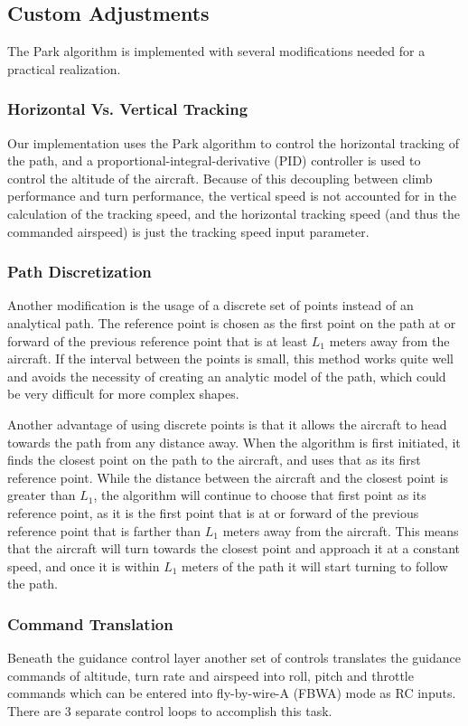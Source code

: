 \documentclass{aiaa}
\begin{document}
\subsection{Custom Adjustments}
The Park algorithm is implemented with several modifications needed for a practical realization.

\subsubsection{Horizontal Vs. Vertical Tracking}
 Our implementation uses the Park algorithm to control the horizontal tracking of the path, and a proportional-integral-derivative (PID) controller is used to control the altitude of the aircraft. Because of this decoupling between climb performance and turn performance, the vertical speed is not accounted for in the calculation of the tracking speed, and the horizontal tracking speed (and thus the commanded airspeed) is just the tracking speed input parameter.

\subsubsection{Path Discretization}
Another modification is the usage of a discrete set of points instead of an analytical path. The reference point is chosen as the first point on the path at or forward of the previous reference point that is at least $L_1$ meters away from the aircraft. If the interval between the points is small, this method works quite well and avoids the necessity of creating an analytic model of the path, which could be very difficult for more complex shapes. 

Another advantage of using discrete points is that it allows the aircraft to head towards the path from any distance away. When the algorithm is first initiated, it finds the closest point on the path to the aircraft, and uses that as its first reference point. While the distance between the aircraft and the closest point is greater than $L_1$, the algorithm will continue to choose that first point as its reference point, as it is the first point that is at or forward of the previous reference point that is farther than $L_1$ meters away from the aircraft. 
This means that the aircraft will turn towards the closest point and approach it at a constant speed, and once it is within $L_1$ meters of the path it will start turning to follow the path. 

\subsubsection{Command Translation}
Beneath the guidance control layer another set of controls translates the guidance commands of altitude, turn rate and airspeed into roll, pitch and throttle commands which can be entered into fly-by-wire-A (FBWA) mode as RC inputs. There are 3 separate control loops to accomplish this task. 
\end{document}
